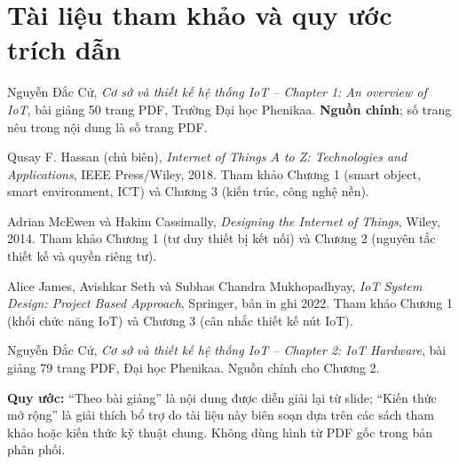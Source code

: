 \documentclass[11pt,oneside]{book}
\begin{document}
\chapter*{Tài liệu tham khảo và quy ước trích dẫn}
\begin{enumerate}[label={[\arabic*]}]
\item Nguyễn Đắc Cử, \textit{Cơ sở và thiết kế hệ thống IoT -- Chapter 1: An overview of IoT}, bài giảng 50 trang PDF, Trường Đại học Phenikaa. \textbf{Nguồn chính}; số trang nêu trong nội dung là số trang PDF.
\item Qusay F. Hassan (chủ biên), \textit{Internet of Things A to Z: Technologies and Applications}, IEEE Press/Wiley, 2018. Tham khảo Chương 1 (smart object, smart environment, ICT) và Chương 3 (kiến trúc, công nghệ nền).
\item Adrian McEwen và Hakim Cassimally, \textit{Designing the Internet of Things}, Wiley, 2014. Tham khảo Chương 1 (tư duy thiết bị kết nối) và Chương 2 (nguyên tắc thiết kế và quyền riêng tư).
\item Alice James, Avishkar Seth và Subhas Chandra Mukhopadhyay, \textit{IoT System Design: Project Based Approach}, Springer, bản in ghi 2022. Tham khảo Chương 1 (khối chức năng IoT) và Chương 3 (cân nhắc thiết kế nút IoT).
\item Nguyễn Đắc Cử, \textit{Cơ sở và thiết kế hệ thống IoT -- Chapter 2: IoT Hardware}, bài giảng 79 trang PDF, Đại học Phenikaa. Nguồn chính cho Chương 2.
\end{enumerate}
\noindent\textbf{Quy ước:} ``Theo bài giảng'' là nội dung được diễn giải lại từ slide; ``Kiến thức mở rộng'' là giải thích bổ trợ do tài liệu này biên soạn dựa trên các sách tham khảo hoặc kiến thức kỹ thuật chung. Không dùng hình từ PDF gốc trong bản phân phối.
\end{document}

